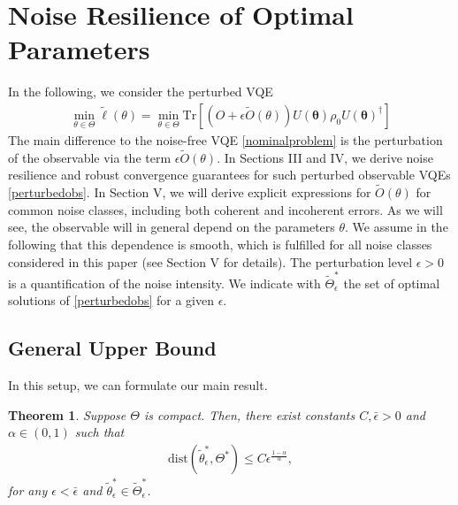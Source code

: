 \documentclass[letterpaper, 10 pt]{IEEEtran}  %
\newcommand{\Tr}{\mathrm{Tr}}
\newtheorem{theorem}{Theorem}
\begin{document}
\section{Noise Resilience of Optimal Parameters}
In the following, we consider the perturbed VQE 
\begin{align}
   \min_{\theta \in \Theta} \tilde{\ell} (\theta) = \min_{\theta \in \Theta} \Tr[(O+\epsilon \tilde{O}(\theta)) U(\mathbf{\theta}) \rho_0 U(\mathbf{\theta})^\dagger] \label{perturbedobs}
\end{align}
The main difference to the noise-free VQE \eqref{nominalproblem} is the perturbation of the observable via the term $\epsilon\tilde{O}(\theta)$.
In Sections III and IV, we derive noise resilience and robust convergence guarantees for such perturbed observable VQEs \eqref{perturbedobs}.  
In Section V, we will derive explicit expressions for $\tilde{O}(\theta)$ for common noise classes, including both coherent and incoherent errors. 
As we will see, the observable will in general depend on the parameters $\theta$. 
We assume in the following that this dependence is smooth, which is fulfilled for all noise classes considered in this paper (see Section V for details). 
The perturbation level $\epsilon >0$ is a quantification of the noise intensity. 
We indicate with $\tilde{\Theta}_\epsilon^*$ the set of optimal solutions of \eqref{perturbedobs} for a given $\epsilon$. %

\subsection{General Upper Bound}
In this setup, we can formulate our main result.
\begin{theorem}
   Suppose $\Theta$ is compact.
   Then, there exist constants $C, \bar\epsilon>0$ and $\alpha \in (0,1)$ such that
\begin{align}
   \mathrm{dist}({\tilde{\theta}^*_\epsilon, \Theta^*})\le C \epsilon^{\frac{1-\alpha}{\alpha}},\label{ebound}
\end{align} 
for any  $\epsilon < \bar\epsilon$ and $\tilde{\theta}_\epsilon^* \in \tilde{\Theta}_\epsilon^*$.
\end{theorem}
\end{document}
